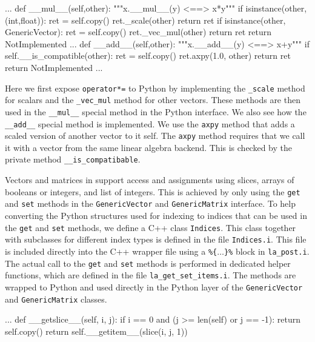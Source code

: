 \begin{code}
\begin{code}
   ...
    def __mul__(self,other):
        """x.__mul__(y) <==> x*y"""
        if isinstance(other,(int,float)):
            ret = self.copy()
            ret._scale(other)
            return ret
        if isinstance(other, GenericVector):
            ret = self.copy()
            ret._vec_mul(other)
            return ret
        return NotImplemented
    ...
    def __add__(self,other):
        """x.__add__(y) <==> x+y"""
        if self.__is_compatible(other):
            ret = self.copy()
            ret.axpy(1.0, other)
            return ret
        return NotImplemented
   ...
\end{code}
Here we first expose \texttt{operator*=} to Python by implementing the \texttt{\_scale} method for scalars and the \texttt{\_vec\_mul} method for other vectors. These methods are then used in the \texttt{\_\_mul\_\_} special method in the Python interface. We also see how the \texttt{\_\_add\_\_} special method is implemented. We use the \texttt{axpy} method that adds a scaled version of another vector to it self. The \texttt{axpy} method requires that we call it with a vector from the same linear algebra backend. This is checked by the private method \texttt{\_\_is\_compatibable}.\par

Vectors and matrices in \pydolfin support access and assignments using slices, \numpy arrays of booleans or integers, and list of integers. This is achieved by only using the \texttt{get} and \texttt{set} methods in the \texttt{GenericVector} and \texttt{GenericMatrix} interface. To help converting the Python structures used for indexing to indices that can be used in the \texttt{get} and \texttt{set} methods, we define a C++ class \texttt{Indices}. This class together with subclasses for different index types is defined in the file \texttt{Indices.i}. This file is included directly into the C++ wrapper file using a \texttt{\%\{$\ldots$\}\%} block in \texttt{la\_post.i}. The actual call to the \texttt{get} and \texttt{set} methods is performed in dedicated helper functions, which are defined in the file \texttt{la\_get}\texttt{\_set\_items.i}. The methods are wrapped to Python and used directly in the Python layer of the \texttt{GenericVector} and \texttt{GenericMatrix} classes.
\begin{code}
   ...
    def __getslice__(self, i, j):
        if i == 0 and (j >= len(self) or j == -1):
            return self.copy()
        return self.__getitem__(slice(i, j, 1))


\end{code}
\end{code}
